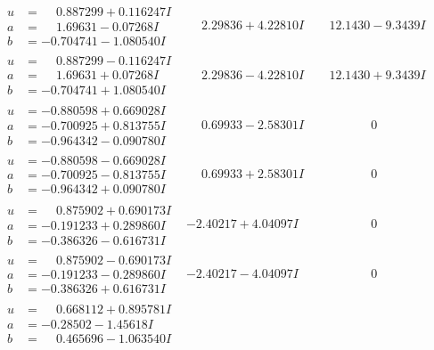 \documentclass[1p]{elsarticle_modified}
\theoremstyle{definition}
\begin{document}
$$\begin{array}{c|c|c}
\begin{aligned}
u &= \phantom{-}0.887299 + 0.116247 I \\
a &= \phantom{-}1.69631 - 0.07268 I \\
b &= -0.704741 - 1.080540 I\end{aligned}
 & \phantom{-}2.29836 + 4.22810 I & \phantom{-}12.1430 - 9.3439 I \\ \hline\begin{aligned}
u &= \phantom{-}0.887299 - 0.116247 I \\
a &= \phantom{-}1.69631 + 0.07268 I \\
b &= -0.704741 + 1.080540 I\end{aligned}
 & \phantom{-}2.29836 - 4.22810 I & \phantom{-}12.1430 + 9.3439 I \\ \hline\begin{aligned}
u &= -0.880598 + 0.669028 I \\
a &= -0.700925 + 0.813755 I \\
b &= -0.964342 - 0.090780 I\end{aligned}
 & \phantom{-}0.69933 - 2.58301 I & \phantom{-0.000000 } 0 \\ \hline\begin{aligned}
u &= -0.880598 - 0.669028 I \\
a &= -0.700925 - 0.813755 I \\
b &= -0.964342 + 0.090780 I\end{aligned}
 & \phantom{-}0.69933 + 2.58301 I & \phantom{-0.000000 } 0 \\ \hline\begin{aligned}
u &= \phantom{-}0.875902 + 0.690173 I \\
a &= -0.191233 + 0.289860 I \\
b &= -0.386326 - 0.616731 I\end{aligned}
 & -2.40217 + 4.04097 I & \phantom{-0.000000 } 0 \\ \hline\begin{aligned}
u &= \phantom{-}0.875902 - 0.690173 I \\
a &= -0.191233 - 0.289860 I \\
b &= -0.386326 + 0.616731 I\end{aligned}
 & -2.40217 - 4.04097 I & \phantom{-0.000000 } 0 \\ \hline\begin{aligned}
u &= \phantom{-}0.668112 + 0.895781 I \\
a &= -0.28502 - 1.45618 I \\
b &= \phantom{-}0.465696 - 1.063540 I\end{aligned}

\end{array}$$
\end{document}
